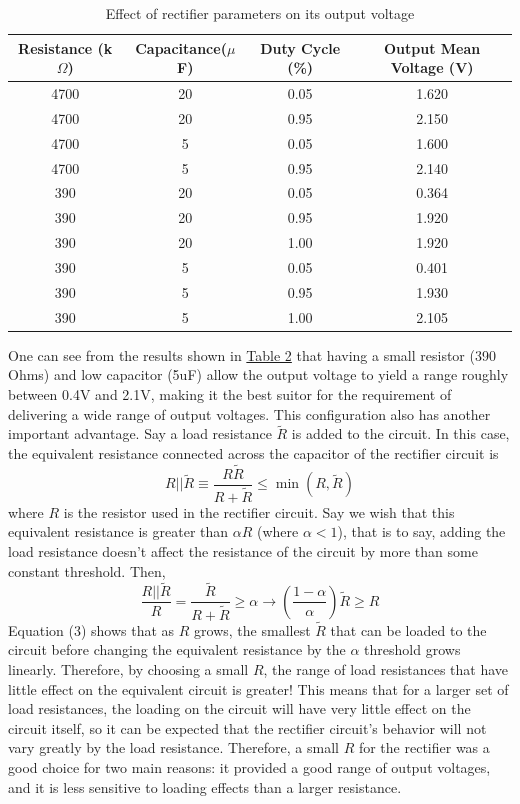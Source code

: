 \documentclass[12pt]{report}
\begin{document}
\begin{table}[h]
	\caption{Effect of rectifier parameters on its output voltage}\label{table2}
	\begin{center}
		\begin{tabular}{|c|c|c|c|}
			\hline
			Resistance (k$\Omega$) & Capacitance($\mu$F) & Duty Cycle (\%) & Output Mean Voltage (V)\\\hline
			4700 & 20 & 0.05 & 1.620\\\hline
			4700 & 20 & 0.95 & 2.150\\\hline
			4700 & 5 & 0.05 & 1.600\\\hline
			4700 & 5 & 0.95 & 2.140\\\hline
			390 & 20 & 0.05 & 0.364	\\\hline
			390 & 20 & 0.95 & 1.920\\\hline
			390 & 20 & 1.00 & 1.920\\\hline
			390 & 5 & 0.05 & 0.401	\\\hline
			390 & 5 & 0.95 & 1.930\\\hline
			390 & 5 & 1.00 & 2.105\\\hline
		\end{tabular}
	\end{center}
\end{table}
One can see from the results shown in \hyperref[table2]{Table 2} that having a small resistor (390
Ohms) and low capacitor (5uF) allow the output voltage
to yield a range roughly between 0.4V and 2.1V, making it the best suitor for the requirement of
delivering a wide range of output voltages. This configuration also has another important advantage.
Say a load resistance $\tilde{R}$ is added to the circuit. In this case, the equivalent resistance
connected across the capacitor of the rectifier circuit is
\begin{equation}
	R||\tilde{R}\equiv\frac{R\tilde{R}}{R+\tilde{R}}\leq\min(R,\tilde{R})
\end{equation}
where $R$ is the resistor used in the rectifier circuit.
Say we wish that this equivalent resistance is greater than $\alpha R$ (where $\alpha<1$), that is to say, adding the
load resistance doesn't affect the resistance of the circuit by more than some constant threshold. Then,
\begin{equation}
	\frac{R||\tilde{R}}{R} =
	\frac{\tilde{R}}{R+\tilde{R}}\geq\alpha\rightarrow\left(\frac{1-\alpha}{\alpha}\right)\tilde{R}\geq R
\end{equation}
Equation (3) shows that as $R$ grows, the smallest $\tilde{R}$ that can be loaded to the circuit
before changing the equivalent resistance by the $\alpha$ threshold grows linearly. Therefore, by
choosing a small $R$, the range of load resistances that have little effect on the equivalent
circuit is greater! This means that for a larger set of load resistances, the loading on the circuit
will have very little effect on the circuit itself, so it can be expected that the rectifier
circuit's behavior will not vary greatly by the load resistance. Therefore, a small $R$ for the
rectifier was a good choice for two main reasons: it provided a good range of output voltages, and
it is less sensitive to loading effects than a larger resistance.
\end{document}
